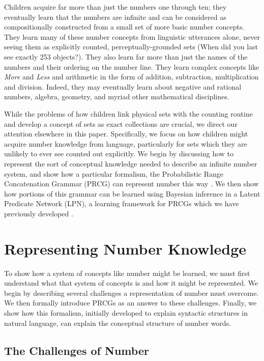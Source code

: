 \documentclass[10pt,letterpaper]{article}
\begin{document}
Children acquire far more than just the numbers one through ten; they
eventually learn that the numbers are infinite and can be considered
as compositionally constructed from a small set of more basic number
concepts. They learn many of these number concepts from linguistic
utterances alone, never seeing them as explicitly counted,
perceptually-grounded sets (When did you last see exactly 253
objects?). They also learn far more than just the names of the numbers
and their ordering on the number line. They learn complex concepts
like \emph{More} and \emph{Less} and arithmetic in the form of
addition, subtraction, multiplication and division. Indeed, they may
eventually learn about negative and rational numbers, algebra,
geometry, and myriad other mathematical disciplines.

While the problems of how children link physical sets with the
counting routine and develop a concept of sets as exact collections
are crucial, we direct our attention elsewhere in this paper.
Specifically, we focus on how children might acquire number knowledge
from language, particularly for sets which they are unlikely to ever
see counted out explicitly. We begin by discussing how to represent
the sort of conceptual knowledge needed to describe an infinite number
system, and show how a particular formalism, the Probabilistic Range
Concatenation Grammar (PRCG) can represent number this way
\citep{boullier2005range}. We then show how portions of this grammar
can be learned using Bayesian inference in a Latent Predicate Network
(LPN), a learning framework for PRCGs which we have previously
developed \citep{DecRulTenming}.

\section{Representing Number Knowledge}

To show how a system of concepts like number might be learned, we must
first understand what that system of concepts is and how it might be
represented. We begin by describing several challenges a
representation of number must overcome. We then formally introduce
PRCGs as an answer to these challenges. Finally, we show how this
formalism, initially developed to explain syntactic structures in
natural language, can explain the conceptual structure of number
words.

\subsection{The Challenges of Number}
\end{document}
